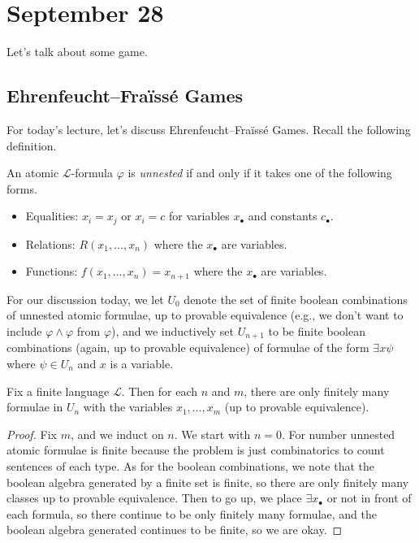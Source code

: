 \documentclass[../notes.tex]{subfiles}
\begin{document}
\section{September 28}

Let's talk about some game.

\subsection{Ehrenfeucht--Fra\"iss\'e Games}
For today's lecture, let's discuss Ehrenfeucht--Fra\"iss\'e Games. Recall the following definition.
\begin{definition}[unnested]
	An atomic $\mathcal L$-formula $\varphi$ is \textit{unnested} if and only if it takes one of the following forms.
	\begin{itemize}
		\item Equalities: $x_i=x_j$ or $x_i=c$ for variables $x_\bullet$ and constants $c_\bullet$.
		\item Relations: $R(x_1,\ldots,x_n)$ where the $x_\bullet$ are variables.
		\item Functions: $f(x_1,\ldots,x_n)=x_{n+1}$ where the $x_\bullet$ are variables.
	\end{itemize}
\end{definition}
For our discussion today, we let $U_0$ denote the set of finite boolean combinations of unnested atomic formulae, up to provable equivalence (e.g., we don't want to include $\varphi\land\varphi$ from $\varphi$), and we inductively set $U_{n+1}$ to be finite boolean combinations (again, up to provable equivalence) of formulae of the form $\exists x\psi$ where $\psi\in U_n$ and $x$ is a variable.
\begin{proposition} \label{prop:finiteness-of-u-n}
	Fix a finite language $\mathcal L$. Then for each $n$ and $m$, there are only finitely many formulae in $U_n$ with the variables $x_1,\ldots,x_m$ (up to provable equivalence).
\end{proposition}
\begin{proof}
	Fix $m$, and we induct on $n$. We start with $n=0$. For number unnested atomic formulae is finite because the problem is just combinatorics to count sentences of each type. As for the boolean combinations, we note that the boolean algebra generated by a finite set is finite,\todo{} so there are only finitely many classes up to provable equivalence. Then to go up, we place $\exists x_\bullet$ or not in front of each formula, so there continue to be only finitely many formulae, and the boolean algebra generated continues to be finite, so we are okay.
\end{proof}
\end{document}
